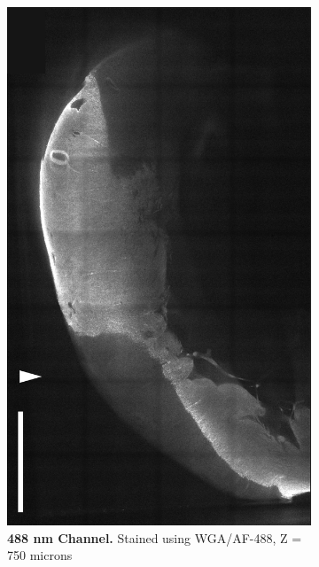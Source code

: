 \begin{figure}[H]
    \centering
    \begin{subfigure}[t]{0.48\textwidth}
        \includegraphics[width=1\linewidth]{Images/T_Sham_R_Figure_Draft_488.png}
        \caption{\textbf{488 nm Channel.} Stained using WGA/AF-488, Z = 750 microns}
    \end{subfigure}
        \medskip
    ~
    \begin{subfigure}[t]{0.48\textwidth}

\end{subfigure}
\end{figure}
